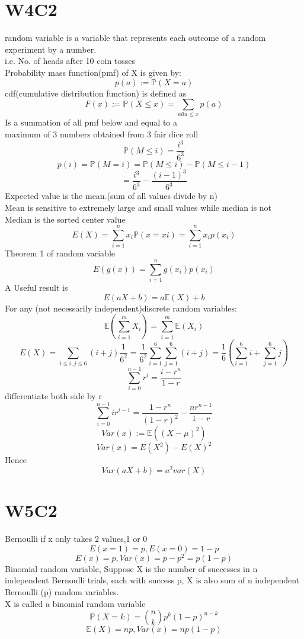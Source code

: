 \documentclass{article}
\begin{document}
\section{W4C2}
random variable is a variable that represents each outcome of a random experiment by a number.\\
i.e. No. of heads after 10 coin tosses\\
Probability mass function(pmf) of X is given by:
$$
p(a):=\mathbb P(X=a)
$$
cdf(cumulative distribution function) is defined as\\
$$
F(x):=\mathbb{P}(X\leq x)=\sum_{all a\leq x}p(a)
$$
Is a summation of all pmf below and equal to a\\
maximum of 3 numbers obtained from 3 fair dice roll
$$
\mathbb{P}(M\leq i)=\frac{i^3}{6^3}
$$
$$
p(i)=\mathbb{P}(M=i)=\mathbb{P}(M\leq i)-\mathbb{P}(M\leq i-1)
$$
$$
=\frac{i^3}{6^3}-\frac{(i-1)^3}{6^3}
$$
Expected value is the mean.(sum of all values divide by n)\\
Mean is sensitive to extremely large and small values while median is not\\
Median is the sorted center value\\
$$
E(X)=\sum_{i=1}^n x_i\mathbb P(x=xi)=\sum_{i=1}^n x_ip(x_i)
$$
Theorem 1 of random variable\\
$$
E(g(x))=\sum_{i=1}^ng(x_i)p(x_i)
$$
A Useful result is
$$
E(aX+b)=a\mathbb E(X)+b
$$
For any (not necessarily independent)discrete random variables:
$$
\mathbb E(\sum_{i=1}^mX_i)=\sum_{i=1}^m\mathbb{E}(X_i)
$$
$$
E(X)=\sum_{i\leq i,j \leq 6}(i+j)\frac{1}{6^2}=\frac{1}{6^2}\sum_{i=1}^6\sum_{j=1}^6(i+j)=\frac{1}{6}(\sum_{i=1}^6i+\sum_{j=1}^6j)
$$
$$
\sum_{i=0}^{n-1}r^i=\frac{i-r^n}{1-r}
$$
differentiate both side by r
$$
\sum_{i=0}^{n-1}ir^{i-1}=\frac{1-r^n}{(1-r)^2}-\frac{nr^{n-1}}{1-r}
$$
$$
Var(x):=\mathbb{E}((X-\mu)^2)
$$
$$
Var(x)=E(X^2)-E(X)^2
$$
Hence
$$
Var(aX+b)=a^2var(X)
$$
\section{W5C2}
Bernoulli if x only takes 2 values,1 or 0
$$
E(x=1)=p,E(x=0)=1-p
$$
$$
E(x)=p, Var(x)=p-p^2=p(1-p)
$$
Binomial random variable, Suppose X is the number of successes in n independent Bernoulli trials, each with success p, X is also sum of n independent Bernoulli (p) random variables.\\

X is called a binomial random variable
$$
\mathbb{P}(X=k)={n \choose k}p^k(1-p)^{n-k}
$$
$$
\mathbb{E}(X)=np, Var(x)=np(1-p)
$$
\end{document}
